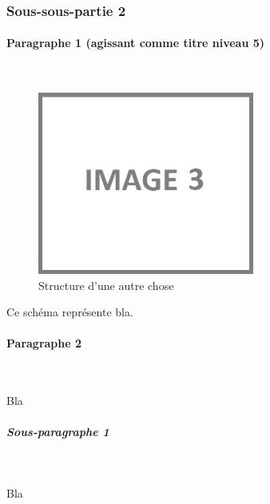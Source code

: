 \newpage

\subsubsection{Sous-sous-partie 2}

\paragraph{Paragraphe 1 (agissant comme titre niveau 5)}
~\\
\hskip7mm

\begin{figure}[!ht]
\begin{center}
\includegraphics[height=6cm]{autre_partie/image3}
\end{center}
\caption[Structure d'unz autre chose]{Structure d'une autre chose\protect\footnotemark}
\end{figure}

Ce schéma représente bla.


\paragraph{Paragraphe 2}
~\\
\hskip7mm


Bla

\subparagraph{Sous-paragraphe 1}
~\\
\hskip7mm

Bla

